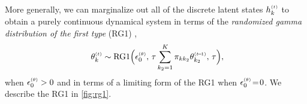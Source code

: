 \documentclass{article}
\begin{document}
More generally, we can marginalize out all of the discrete latent states $\hkt$ to obtain a purely continuous dynamical system in terms of the \emph{randomized gamma distribution of the first type} (RG1) \cite{yuan2000bessel,makarov2010exact},~
\begin{equation}
\label{eq:rg1}
\
\thetakt \sim \textrm{RG1}\Big(\epstheta,\,\tau\sum_{k_2=1}^K \pi_{kk_2} \thetakttm,\, \tau\Big),
% 
\end{equation}
when $\epstheta > 0$ and in terms of a limiting form of the RG1 when $\epstheta \teq 0$. We describe the RG1 in \cref{fig:rg1}.~

\end{document}
